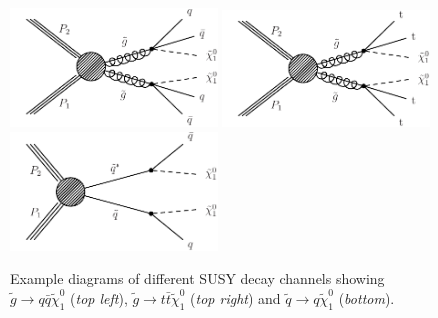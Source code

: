 \begin{figure}[!t]
  \centering
  \begin{minipage}[c]{1.\textwidth}
    \begin{center}
      \includegraphics[width=0.49\textwidth]{figures/T1qqqq.pdf}  
      \includegraphics[width=0.49\textwidth]{figures/T1tttt_feyn.pdf} \\
      \includegraphics[width=0.49\textwidth]{figures/T2qq.pdf}
    \end{center}
  \end{minipage}
  \caption{Example diagrams of different SUSY decay channels showing $\tilde{g} \rightarrow q\bar{q} \tilde{\chi}_1^0$ (\textit{top left}), $\tilde{g} \rightarrow t\bar{t}\tilde{\chi}_1^0$ (\textit{top right}) and $\tilde{q} \rightarrow q\tilde{\chi}_1^0$ (\textit{bottom}).}
  \label{fig:susy_decay}
\end{figure}
